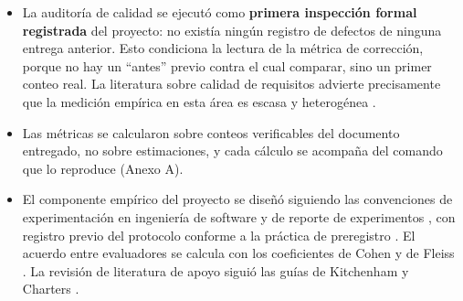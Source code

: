 \begin{itemize}
\item La auditor\'ia de calidad se ejecut\'o como \textbf{primera inspecci\'on formal registrada} del proyecto: no exist\'ia ning\'un registro de defectos de ninguna entrega anterior. Esto condiciona la lectura de la m\'etrica de correcci\'on, porque no hay un ``antes'' previo contra el cual comparar, sino un primer conteo real. La literatura sobre calidad de requisitos advierte precisamente que la medici\'on emp\'irica en esta \'area es escasa y heterog\'enea \cite{montgomery2022empirical}.
\item Las m\'etricas se calcularon sobre conteos verificables del documento entregado, no sobre estimaciones, y cada c\'alculo se acompa\~na del comando que lo reproduce (Anexo A).
\item El componente emp\'irico del proyecto se dise\~n\'o siguiendo las convenciones de experimentaci\'on en ingenier\'ia de software \cite{wohlin2012experimentation} y de reporte de experimentos \cite{jedlitschka2008reporting}, con registro previo del protocolo conforme a la pr\'actica de preregistro \cite{nosek2018preregistration}. El acuerdo entre evaluadores se calcula con los coeficientes de Cohen \cite{cohen1960coefficient} y de Fleiss \cite{fleiss1971measuring}. La revisi\'on de literatura de apoyo sigui\'o las gu\'ias de Kitchenham y Charters \cite{kitchenham2007guidelines}.
\end{itemize}
